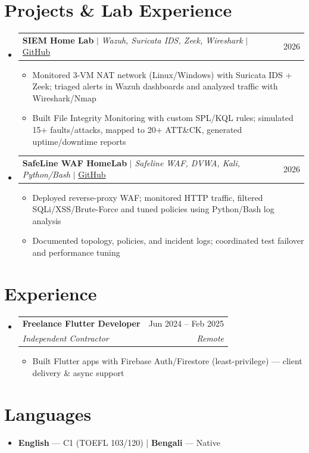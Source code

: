 \documentclass[letterpaper,11pt]{article}
\makeatletter
\newcommand{\resumeItem}[1]{
  \item\small{#1}
}
\newcommand{\resumeSubheading}[4]{
  \vspace{-2pt}\item
    \begin{tabular*}{0.97\textwidth}[t]{l@{\extracolsep{\fill}}r}
      \textbf{#1} & #2 \\
      \textit{\small#3} & \textit{\small #4} \\
    \end{tabular*}\vspace{-7pt}
}
\newcommand{\resumeProjectHeading}[2]{
    \item
    \begin{tabular*}{0.97\textwidth}{l@{\extracolsep{\fill}}r}
      \small#1 & #2 \\
    \end{tabular*}\vspace{-7pt}
}
\newcommand{\resumeSubHeadingListStart}{\begin{itemize}[leftmargin=0.15in, label={}]}
\newcommand{\resumeSubHeadingListEnd}{\end{itemize}}
\newcommand{\resumeItemListStart}{\begin{itemize}}
\newcommand{\resumeItemListEnd}{\end{itemize}\vspace{-5pt}}
\makeatother
\begin{document}
\section{Projects \& Lab Experience}
\resumeSubHeadingListStart%
\resumeProjectHeading%
{\textbf{SIEM Home Lab} $|$ \emph{Wazuh, Suricata IDS, Zeek, Wireshark} $|$ \href{https://github.com/Sohanuzzaman3301/SIEM_Home_Lab}{\small GitHub}}{2026}
\resumeItemListStart%
\resumeItem{Monitored 3-VM NAT network (Linux/Windows) with Suricata IDS + Zeek; triaged alerts in Wazuh dashboards and analyzed traffic with Wireshark/Nmap}
\resumeItem{Built File Integrity Monitoring with custom SPL/KQL rules; simulated 15+ faults/attacks, mapped to 20+ ATT\&CK, generated uptime/downtime reports}
\resumeItemListEnd%
\resumeProjectHeading%
{\textbf{SafeLine WAF HomeLab} $|$ \emph{Safeline WAF, DVWA, Kali, Python/Bash} $|$ \href{https://github.com/Sohanuzzaman3301/safeline-waf-homelab}{\small GitHub}}{2026}
\resumeItemListStart%
\resumeItem{Deployed reverse-proxy WAF; monitored HTTP traffic, filtered SQLi/XSS/Brute-Force and tuned policies using Python/Bash log analysis}
\resumeItem{Documented topology, policies, and incident logs; coordinated test failover and performance tuning}
\resumeItemListEnd%
\resumeSubHeadingListEnd%

\section{Experience}
\resumeSubHeadingListStart%
\resumeSubheading%
{Freelance Flutter Developer}{Jun 2024 -- Feb 2025}
{Independent Contractor}{Remote}
\resumeItemListStart%
\resumeItem{Built Flutter apps with Firebase Auth/Firestore (least-privilege) — client delivery \& async support}
\resumeItemListEnd%
\resumeSubHeadingListEnd%

\section{Languages}
\begin{itemize}[leftmargin=0.15in, label={}]
\small
\item{\textbf{English} --- C1 (TOEFL 103/120) | \textbf{Bengali} --- Native}
\end{itemize}
\end{document}
